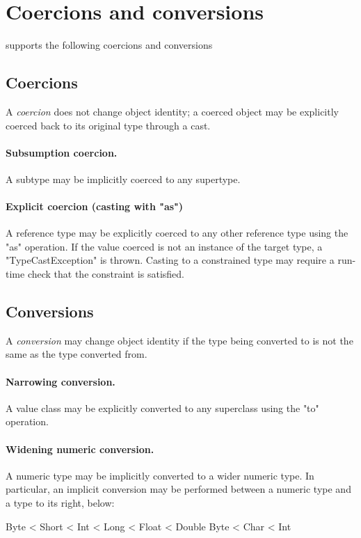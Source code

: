 \section{Coercions and conversions}
\label{XtenConversions}

\XtenCurrVer{} supports the following coercions and conversions

\subsection{Coercions}

A {\em coercion} does not change object identity;
a coerced object may be explicitly coerced back to its original
type through a cast.

\paragraph{Subsumption coercion.}
A subtype may be implicitly coerced to any supertype.

\paragraph{Explicit coercion (casting with \xcd"as")}
A reference type may be explicitly coerced to any other
reference type using the \xcd"as" operation.
If the value coerced is not an instance of the target type,
a \xcd"TypeCastException" is thrown.  Casting to a constrained
type may require a run-time check that the constraint is
satisfied.

\subsection{Conversions}

A {\em conversion} may change object identity if the type being
converted to is not the same as the type converted from.

\paragraph{Narrowing conversion.}
A value class may be explicitly converted to any superclass
using the \xcd"to" operation.


\paragraph{Widening numeric conversion.}
A numeric type may be implicitly converted to a wider
numeric type.
In particular, an implicit conversion may be performed between
a numeric type and a type to its right, below:
\begin{xten}
Byte < Short < Int < Long < Float < Double
Byte < Char < Int
\end{xten}

